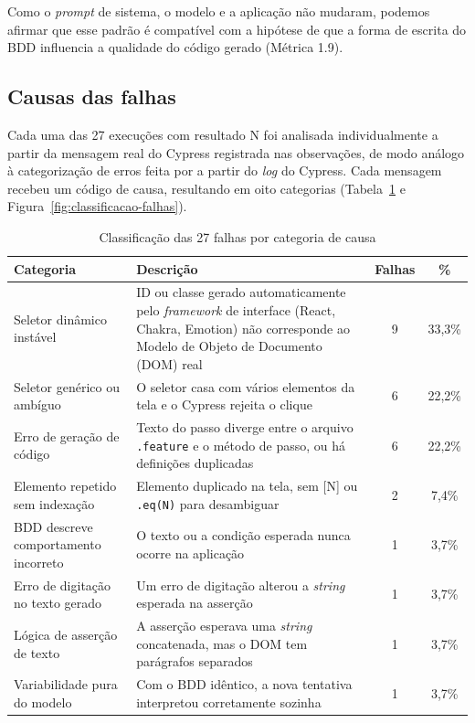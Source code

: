 Como o \textit{prompt} de sistema, o modelo e a aplicação não mudaram, podemos afirmar que esse padrão é compatível com a hipótese de que a forma de escrita do BDD influencia a qualidade do código gerado (Métrica 1.9).

\subsection{Causas das falhas}
\label{subsec:causas-erros}

Cada uma das 27 execuções com resultado N foi analisada individualmente a partir da mensagem real do Cypress registrada nas observações, de modo análogo à categorização de erros feita por  a partir do \textit{log} do Cypress. Cada mensagem recebeu um código de causa, resultando em oito categorias (Tabela~\ref{tab:categorias} e Figura~\ref{fig:classificacao-falhas}).

\begin{table}[htb]
\centering
\footnotesize
\caption{Classificação das 27 falhas por categoria de causa}
\label{tab:categorias}
\begin{tabular}{p{3.6cm}p{7.4cm}cc}
\hline
\textbf{Categoria} & \textbf{Descrição} & \textbf{Falhas} & \textbf{\%} \\
\hline
Seletor dinâmico instável & ID ou classe gerado automaticamente pelo \textit{framework} de interface (React, Chakra, Emotion) não corresponde ao Modelo de Objeto de Documento (DOM) real & 9 & 33,3\% \\
Seletor genérico ou ambíguo & O seletor casa com vários elementos da tela e o Cypress rejeita o clique & 6 & 22,2\% \\
Erro de geração de código & Texto do passo diverge entre o arquivo \texttt{.feature} e o método de passo, ou há definições duplicadas & 6 & 22,2\% \\
Elemento repetido sem indexação & Elemento duplicado na tela, sem [N] ou \texttt{.eq(N)} para desambiguar & 2 & 7,4\% \\
BDD descreve comportamento incorreto & O texto ou a condição esperada nunca ocorre na aplicação & 1 & 3,7\% \\
Erro de digitação no texto gerado & Um erro de digitação alterou a \textit{string} esperada na asserção & 1 & 3,7\% \\
Lógica de asserção de texto & A asserção esperava uma \textit{string} concatenada, mas o DOM tem parágrafos separados & 1 & 3,7\% \\
Variabilidade pura do modelo & Com o BDD idêntico, a nova tentativa interpretou corretamente sozinha & 1 & 3,7\% \\
\hline
\end{tabular}
\end{table}


